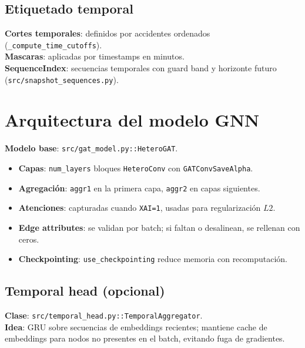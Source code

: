 \subsection{Etiquetado temporal}
\textbf{Cortes temporales}: definidos por accidentes ordenados (\texttt{\_compute\_time\_cutoffs}).\\
\textbf{Mascaras}: aplicadas por timestamps en minutos.\\
\textbf{SequenceIndex}: secuencias temporales con guard band y horizonte futuro
(\texttt{src/snapshot\_sequences.py}).

\section{Arquitectura del modelo GNN}
\textbf{Modelo base}: \texttt{src/gat\_model.py::HeteroGAT}.
\begin{itemize}[leftmargin=*]
  \item \textbf{Capas}: \texttt{num\_layers} bloques \texttt{HeteroConv} con \texttt{GATConvSaveAlpha}.
  \item \textbf{Agregaci\'on}: \texttt{aggr1} en la primera capa, \texttt{aggr2} en capas siguientes.
  \item \textbf{Atenciones}: capturadas cuando \texttt{XAI=1}, usadas para regularizaci\'on $L2$.
  \item \textbf{Edge attributes}: se validan por batch; si faltan o desalinean, se rellenan con ceros.
  \item \textbf{Checkpointing}: \texttt{use\_checkpointing} reduce memoria con recomputaci\'on.
\end{itemize}

\subsection{Temporal head (opcional)}
\textbf{Clase}: \texttt{src/temporal\_head.py::TemporalAggregator}.\\
\textbf{Idea}: GRU sobre secuencias de embeddings recientes; mantiene cache de embeddings para nodos no presentes en el batch, evitando fuga de gradientes.


